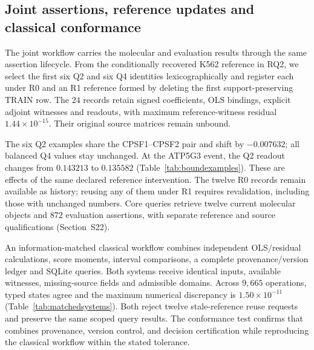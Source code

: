 \FloatBarrier
\subsection{Joint assertions, reference updates and classical conformance}\label{subsec:result-system}
The joint workflow carries the molecular and evaluation results through the same assertion lifecycle. From the conditionally recovered K562 reference in RQ2, we select the first six Q2 and six Q4 identities lexicographically and register each under R0 and an R1 reference formed by deleting the first support-preserving TRAIN row. The $24$ records retain signed coefficients, OLS bindings, explicit adjoint witnesses and readouts, with maximum reference-witness residual $1.44\times10^{-15}$. Their original source matrices remain unbound.

The six Q2 examples share the CPSF1--CPSF2 pair and shift by $-0.007632$; all balanced Q4 values stay unchanged. At the ATP5G3 event, the Q2 readout changes from $0.143213$ to $0.135582$ (Table~\ref{tab:boundexamples}). These are effects of the same declared reference intervention. The twelve R0 records remain available as history; reusing any of them under R1 requires revalidation, including those with unchanged numbers. Core queries retrieve twelve current molecular objects and $872$ evaluation assertions, with separate reference and source qualifications (Section~S22).

An information-matched classical workflow combines independent OLS/residual calculations, score moments, interval comparisons, a complete provenance/version ledger and SQLite queries. Both systems receive identical inputs, available witnesses, missing-source fields and admissible domains. Across $9{,}665$ operations, typed states agree and the maximum numerical discrepancy is $1.50\times10^{-11}$ (Table~\ref{tab:matchedsystems}). Both reject twelve stale-reference reuse requests and preserve the same scoped query results. The conformance test confirms that \method combines provenance, version control, and decision certification while reproducing the classical workflow within the stated tolerance.

